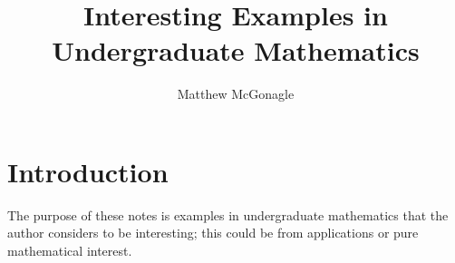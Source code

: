 \documentclass{article}
\title{Interesting Examples in Undergraduate Mathematics}
\author{Matthew McGonagle}
\begin{document}
\maketitle

\tableofcontents

\section{Introduction}

The purpose of these notes is examples in undergraduate mathematics that the author considers to be interesting; this could be from applications or pure mathematical interest. 






{}

\end{document}
